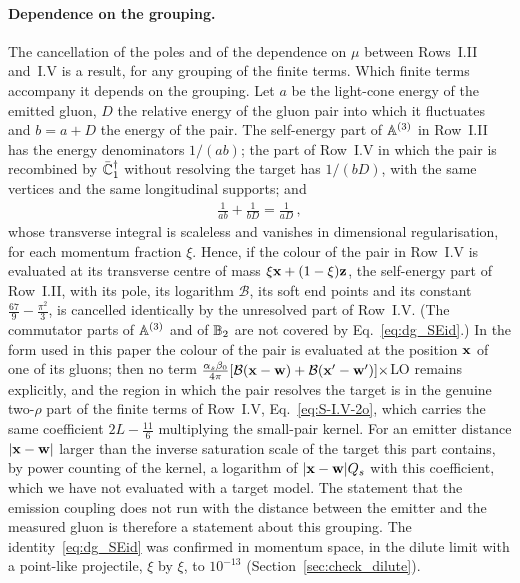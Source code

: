 \paragraph{Dependence on the grouping.} The cancellation of the poles and of the dependence on $\mu$ between Rows~I.II and~I.V is a result, for any grouping of the finite terms. Which finite terms accompany it depends on the grouping. Let $a$ be the light-cone energy of the emitted gluon, $D$ the relative energy of the gluon pair into which it fluctuates and $b=a+D$ the energy of the pair. The self-energy part of $\mathbb{A}^{(3)}$ in Row~I.II has the energy denominators $1/(ab)$; the part of Row~I.V in which the pair is recombined by $\bar{\mathbb{C}}_1^\dagger$ without resolving the target has $1/(bD)$, with the same vertices and the same longitudinal supports; and
\begin{align}\label{eq:dg_SEid}
\frac{1}{ab}+\frac{1}{bD}=\frac{1}{aD}\,,
\end{align}
whose transverse integral is scaleless and vanishes in dimensional regularisation, for each momentum fraction $\xi$. Hence, if the colour of the pair in Row~I.V is evaluated at its transverse centre of mass $\xi\mathbf{x}+(1-\xi)\mathbf{z}$, the self-energy part of Row~I.II, with its pole, its logarithm $\mathcal B$, its soft end points and its constant $\frac{67}{9}-\frac{\pi^2}{3}$, is cancelled identically by the unresolved part of Row~I.V. (The commutator parts of $\mathbb{A}^{(3)}$ and of $\mathbb{B}_2$ are not covered by Eq.~\eqref{eq:dg_SEid}.) In the form used in this paper the colour of the pair is evaluated at the position $\mathbf{x}$ of one of its gluons; then no term $\frac{\alpha_s\beta_0}{4\pi}[\mathcal B(\mathbf{x}-\mathbf{w})+\mathcal B(\mathbf{x}'-\mathbf{w}')]\times$LO remains explicitly, and the region in which the pair resolves the target is in the genuine two-$\rho$ part of the finite terms of Row~I.V, Eq.~\eqref{eq:S-I.V-2o}, which carries the same coefficient $2L-\frac{11}{6}$ multiplying the small-pair kernel. For an emitter distance $|\mathbf{x}-\mathbf{w}|$ larger than the inverse saturation scale of the target this part contains, by power counting of the kernel, a logarithm of $|\mathbf{x}-\mathbf{w}|Q_s$ with this coefficient, which we have not evaluated with a target model. The statement that the emission coupling does not run with the distance between the emitter and the measured gluon is therefore a statement about this grouping. The identity~\eqref{eq:dg_SEid} was confirmed in momentum space, in the dilute limit with a point-like projectile, $\xi$ by $\xi$, to $10^{-13}$ (Section~\ref{sec:check_dilute}).

